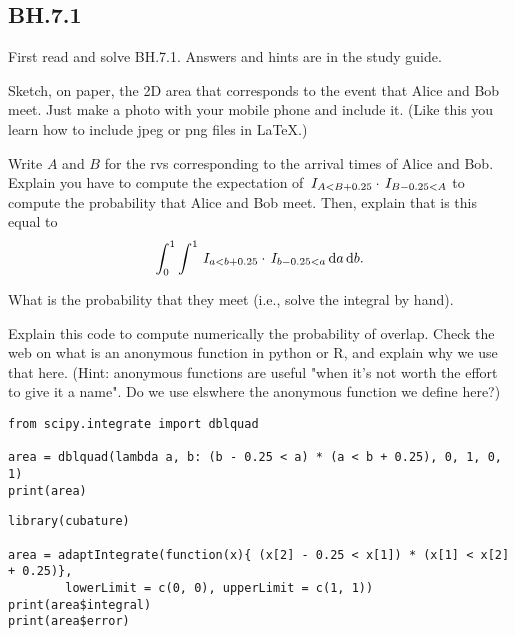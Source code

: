 \subsection{BH.7.1}
\label{sec:bh.7.1}

First read and solve BH.7.1. Answers and hints are in the study guide.


\begin{exercise}\label{ex:ab}
Sketch, on paper, the 2D area that corresponds to the event that Alice and Bob meet. Just make a photo with your mobile phone and include it. (Like this you learn how to include jpeg or png files in \LaTeX.)
\end{exercise}

\begin{exercise}
Write $A$ and $B$ for the rvs corresponding to the arrival times of Alice and Bob.
Explain  you have to compute the expectation of  $\,I_{A<B+0.25}\cdot\,I_{B-0.25 < A}$
to compute the probability that Alice and Bob meet.
Then,  explain that is this equal to
\begin{equation}
\int_0^1\int_{}^1 \,I_{a<b+0.25}\cdot \,I_{b-0.25 < a} \,\textrm{d}a \,\textrm{d}b.
\end{equation}
\end{exercise}

\begin{exercise}
What is the probability that they meet (i.e., solve the integral by hand).
\end{exercise}

\begin{exercise}
Explain this code to compute numerically the probability of overlap. Check the web on what is an anonymous function in python or R, and explain why we use that here.
(Hint: anonymous functions are useful "when it’s not worth the effort to give it a name". Do we use elswhere the anonymous function we define here?)
\begin{verbatim}
from scipy.integrate import dblquad

area = dblquad(lambda a, b: (b - 0.25 < a) * (a < b + 0.25), 0, 1, 0, 1)
print(area)
\end{verbatim}

\begin{verbatim}
library(cubature)   

area = adaptIntegrate(function(x){ (x[2] - 0.25 < x[1]) * (x[1] < x[2] + 0.25)}, 
		lowerLimit = c(0, 0), upperLimit = c(1, 1))
print(area$integral)
print(area$error)
\end{verbatim}
\end{exercise}

